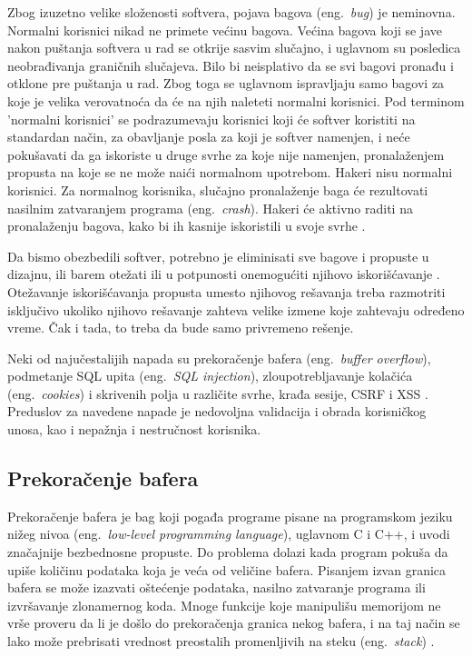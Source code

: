 \documentclass[a4paper]{article}
\begin{document}
Zbog izuzetno velike složenosti softvera, pojava bagova (eng.~{\em bug}) je neminovna. Normalni korisnici nikad ne primete većinu bagova. Većina bagova koji se jave nakon puštanja softvera u rad se otkrije sasvim slučajno, i uglavnom su posledica neobrađivanja graničnih slučajeva. Bilo bi neisplativo da se svi bagovi pronađu i otklone pre puštanja u rad. Zbog toga se uglavnom ispravljaju samo bagovi za koje je velika verovatnoća da će na njih naleteti normalni korisnici. Pod terminom 'normalni korisnici' se podrazumevaju korisnici koji će softver koristiti na standardan način, za obavljanje posla za koji je softver namenjen, i neće pokušavati da ga iskoriste u druge svrhe za koje nije namenjen, pronalaženjem propusta na koje se ne može naići normalnom upotrebom. Hakeri nisu normalni korisnici. Za normalnog korisnika, slučajno pronalaženje baga će rezultovati nasilnim zatvaranjem programa (eng.~{\em crash}). Hakeri će aktivno raditi na pronalaženju bagova, kako bi ih kasnije iskoristili u svoje svrhe \cite{softwaresecurity}.

Da bismo obezbedili softver, potrebno je eliminisati sve bagove i propuste u dizajnu, ili barem otežati ili u potpunosti onemogućiti njihovo iskorišćavanje \cite{top10flaws}. Otežavanje iskorišćavanja propusta umesto njihovog rešavanja treba razmotriti isključivo ukoliko njihovo rešavanje zahteva velike izmene koje zahtevaju određeno vreme. Čak i tada, to treba da bude samo privremeno rešenje.

Neki od najučestalijih napada su prekoračenje bafera (eng.~{\em buffer overflow}), podmetanje SQL upita (eng.~{\em SQL injection}), zloupotrebljavanje kolačića (eng.~{\em cookies}) i skrivenih polja u različite svrhe, krađa sesije, CSRF i XSS \cite{frontmatter}.
Preduslov za navedene napade je nedovoljna validacija i obrada korisničkog unosa, kao i nepažnja i nestručnost korisnika.

\subsection{Prekoračenje bafera}
\label{subsec:bufferoverflow}
Prekoračenje bafera je bag koji pogađa programe pisane na programskom jeziku nižeg nivoa (eng.~{\em low-level programming language}), uglavnom C i C++, i uvodi značajnije bezbednosne propuste. Do problema dolazi kada program pokuša da upiše količinu podataka koja je veća od veličine bafera. Pisanjem izvan granica bafera se može izazvati oštećenje podataka, nasilno zatvaranje programa ili izvršavanje zlonamernog koda. Mnoge funkcije koje manipulišu memorijom ne vrše proveru da li je došlo do prekoračenja granica nekog bafera, i na taj način se lako može prebrisati vrednost preostalih promenljivih na steku (eng.~{\em stack}) \cite{smashingthestack}.
\end{document}
